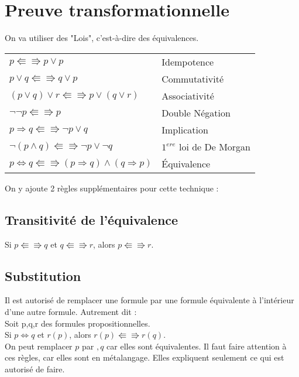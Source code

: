 		\section{Preuve transformationnelle}
			On va utiliser des "Lois", c'est-à-dire des équivalences.
			\begin{center}
			\begin{tabular}{|ll|}
			\hline
			$p \Lleftarrow \Rrightarrow p \lor p$ & Idempotence\\
			$p \lor q \Lleftarrow \Rrightarrow q \lor p$ & Commutativité\\
			$(p \lor q) \lor r \Lleftarrow \Rrightarrow p \lor (q \lor r)$ & Associativité\\
			$ \lnot \lnot p \Lleftarrow \Rrightarrow p$ & Double Négation\\
			$p \Rightarrow q \Lleftarrow \Rrightarrow \lnot p \lor q$ & Implication\\
			$\lnot (p \land q) \Lleftarrow \Rrightarrow \lnot p \lor \lnot q$ & $1^{ere}$ loi de De Morgan\\
			$p \Leftrightarrow q \Lleftarrow \Rrightarrow (p \Rightarrow q) \land (q \Rightarrow p)$ & Équivalence\\
			\hline
			\end{tabular}
			\end{center}
			On y ajoute 2 règles supplémentaires pour cette technique : 
			\subsection*{Transitivité de l'équivalence}
			\indent Si $p \Lleftarrow \Rrightarrow q$ et $q \Lleftarrow \Rrightarrow r$, alors $p \Lleftarrow \Rrightarrow r$.
			\subsection*{Substitution}
			Il est autorisé de remplacer une formule par une formule équivalente à l’intérieur d’une autre formule. Autrement dit : \\
			\indent Soit p,q,r des formules propositionnelles.\\
			\indent Si $p \Leftrightarrow q$ et $r(p)$, alors $r(p) \Lleftarrow \Rrightarrow r(q)$.\\
			On peut remplacer $p$ par $,q$ car elles sont équivalentes. Il faut faire attention à ces règles, car elles sont en métalangage. Elles expliquent seulement ce qui est autorisé de faire.
			
